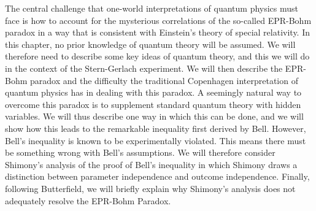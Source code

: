     The central challenge that one-world interpretations of quantum physics must face is how to account for the mysterious correlations of the so-called EPR-Bohm paradox in a way that is consistent with Einstein's theory of special relativity.  In this chapter, no  prior knowledge of quantum theory will be assumed. We will therefore need to describe some key ideas of quantum theory, and this we will do in the context of the  Stern-Gerlach experiment. 
    We will then describe the EPR-Bohm paradox and the difficulty the traditional Copenhagen interpretation of quantum physics has in dealing with this paradox. A seemingly natural way to overcome this paradox is to supplement standard quantum theory with hidden variables. We will thus describe one way in which this can be done, and we will show how this leads to the remarkable inequality first derived by Bell. However, Bell's inequality is known to be experimentally violated. This means there must be something wrong with Bell's assumptions. We will therefore consider Shimony's analysis of the proof of Bell's inequality in which Shimony draws a distinction between parameter independence and outcome independence. Finally, following Butterfield, we will briefly explain why Shimony's analysis does not adequately resolve the EPR-Bohm Paradox. 


    